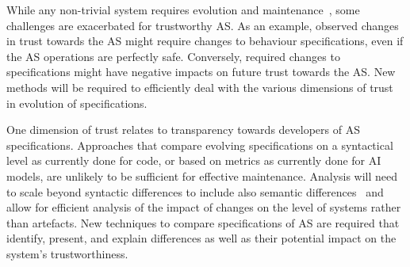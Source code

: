 \documentclass[sigconf,nonacm]{acmart}%
\begin{document}


While any non-trivial system requires evolution and maintenance~\cite{Mens08}, some challenges are exacerbated for trustworthy AS. As an example, observed changes in trust towards the AS might require changes to behaviour specifications, even if the AS operations are perfectly safe. Conversely, required changes to specifications might have negative impacts on future trust towards the AS. New methods will be required to efficiently deal with the various dimensions of trust in evolution of specifications.

One dimension of trust relates to transparency towards developers of AS specifications. Approaches that compare evolving specifications on a syntactical level as currently done for code, or based on metrics as currently done for AI models, are unlikely to be sufficient for effective maintenance. Analysis will need to scale beyond syntactic differences to include also semantic differences~\cite{MaozR18} and allow for efficient analysis of the impact of changes on the level of systems rather than artefacts. New techniques to compare specifications of AS are required that identify, present, and explain differences as well as their potential impact on the system's trustworthiness.
\end{document}
